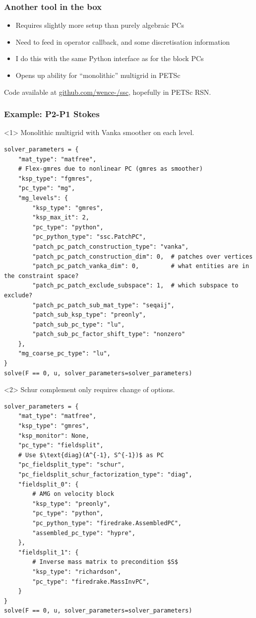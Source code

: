 \documentclass[presentation,aspectratio=43]{beamer}
\begin{document}
\begin{frame}
  \frametitle{Another tool in the box}
  \begin{itemize}
  \item Requires slightly more setup than purely algebraic PCs
  \item Need to feed in operator callback, and some discretisation information
  \item I do this with the same Python interface as for the block PCs
  \item Opens up ability for ``monolithic'' multigrid in PETSc
  \end{itemize}

  Code available at \url{github.com/wence-/ssc}, hopefully in PETSc RSN.
\end{frame}

\begin{frame}[fragile]
  \frametitle{Example: P2-P1 Stokes}
  \begin{onlyenv}<1>
    Monolithic multigrid with Vanka smoother on each level.
\begin{verbatim}
solver_parameters = {
    "mat_type": "matfree",
    # Flex-gmres due to nonlinear PC (gmres as smoother)
    "ksp_type": "fgmres",
    "pc_type": "mg",
    "mg_levels": {
        "ksp_type": "gmres",
        "ksp_max_it": 2,
        "pc_type": "python",
        "pc_python_type": "ssc.PatchPC",
        "patch_pc_patch_construction_type": "vanka",
        "patch_pc_patch_construction_dim": 0,  # patches over vertices
        "patch_pc_patch_vanka_dim": 0,         # what entities are in the constraint space?
        "patch_pc_patch_exclude_subspace": 1,  # which subspace to exclude?
        "patch_pc_patch_sub_mat_type": "seqaij",
        "patch_sub_ksp_type": "preonly",
        "patch_sub_pc_type": "lu",
        "patch_sub_pc_factor_shift_type": "nonzero"
    },
    "mg_coarse_pc_type": "lu",
}
solve(F == 0, u, solver_parameters=solver_parameters)
\end{verbatim}
  \end{onlyenv}
  \begin{onlyenv}<2>
    Schur complement only requires change of options.
\begin{verbatim}
solver_parameters = {
    "mat_type": "matfree",
    "ksp_type": "gmres",
    "ksp_monitor": None,
    "pc_type": "fieldsplit",
    # Use $\text{diag}(A^{-1}, S^{-1})$ as PC
    "pc_fieldsplit_type": "schur",
    "pc_fieldsplit_schur_factorization_type": "diag",
    "fieldsplit_0": {
        # AMG on velocity block
        "ksp_type": "preonly",
        "pc_type": "python",
        "pc_python_type": "firedrake.AssembledPC",
        "assembled_pc_type": "hypre",
    },
    "fieldsplit_1": {
        # Inverse mass matrix to precondition $S$
        "ksp_type": "richardson",
        "pc_type": "firedrake.MassInvPC",
    }
}
solve(F == 0, u, solver_parameters=solver_parameters)
\end{verbatim}
  \end{onlyenv}
\end{frame}
\end{document}
